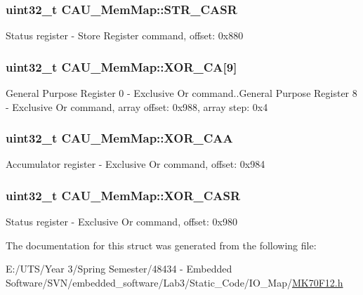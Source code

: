 \subsubsection[{S\+T\+R\+\_\+\+C\+A\+S\+R}]{\setlength{\rightskip}{0pt plus 5cm}uint32\+\_\+t C\+A\+U\+\_\+\+Mem\+Map\+::\+S\+T\+R\+\_\+\+C\+A\+S\+R}\label{struct_c_a_u___mem_map_ad90eef15bc61290af107c3d5871599a8}
Status register -\/ Store Register command, offset\+: 0x880 \hypertarget{struct_c_a_u___mem_map_acb520a0239533ff35af926264fd9a6a9}{}
\subsubsection[{X\+O\+R\+\_\+\+C\+A}]{\setlength{\rightskip}{0pt plus 5cm}uint32\+\_\+t C\+A\+U\+\_\+\+Mem\+Map\+::\+X\+O\+R\+\_\+\+C\+A\mbox{[}9\mbox{]}}\label{struct_c_a_u___mem_map_acb520a0239533ff35af926264fd9a6a9}
General Purpose Register 0 -\/ Exclusive Or command..General Purpose Register 8 -\/ Exclusive Or command, array offset\+: 0x988, array step\+: 0x4 \hypertarget{struct_c_a_u___mem_map_a5597e40ecdc9aaf07f342eea55467ff1}{}
\subsubsection[{X\+O\+R\+\_\+\+C\+A\+A}]{\setlength{\rightskip}{0pt plus 5cm}uint32\+\_\+t C\+A\+U\+\_\+\+Mem\+Map\+::\+X\+O\+R\+\_\+\+C\+A\+A}\label{struct_c_a_u___mem_map_a5597e40ecdc9aaf07f342eea55467ff1}
Accumulator register -\/ Exclusive Or command, offset\+: 0x984 \hypertarget{struct_c_a_u___mem_map_a9a390a748c987c883432ae79087640e2}{}
\subsubsection[{X\+O\+R\+\_\+\+C\+A\+S\+R}]{\setlength{\rightskip}{0pt plus 5cm}uint32\+\_\+t C\+A\+U\+\_\+\+Mem\+Map\+::\+X\+O\+R\+\_\+\+C\+A\+S\+R}\label{struct_c_a_u___mem_map_a9a390a748c987c883432ae79087640e2}
Status register -\/ Exclusive Or command, offset\+: 0x980 

The documentation for this struct was generated from the following file\+:\begin{DoxyCompactItemize}
\item 
E\+:/\+U\+T\+S/\+Year 3/\+Spring Semester/48434 -\/ Embedded Software/\+S\+V\+N/embedded\+\_\+software/\+Lab3/\+Static\+\_\+\+Code/\+I\+O\+\_\+\+Map/\hyperlink{_m_k70_f12_8h}{M\+K70\+F12.\+h}\end{DoxyCompactItemize}
